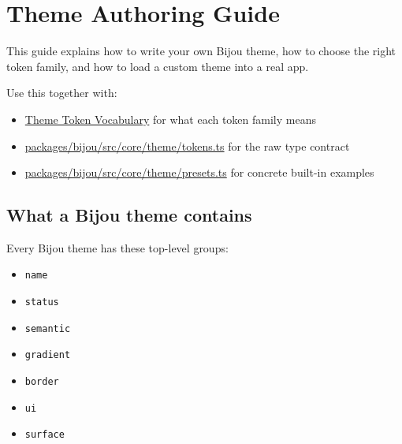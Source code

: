 \chapter{Theme Authoring Guide}\label{record-026}

\smallskip

This guide explains how to write your own Bijou theme, how to choose the right token family, and how to load a custom theme into a real app.

Use this together with:

\begin{itemize}
\tightlist
\item
  \href{https://github.com/flyingrobots/bijou/blob/cbd70612140e7a450d764b3c7be1c6af878b99bc/docs/design-system/theme-tokens.md}{Theme Token Vocabulary} for what each token family means
\item
  \href{https://github.com/flyingrobots/bijou/blob/cbd70612140e7a450d764b3c7be1c6af878b99bc/packages/bijou/src/core/theme/tokens.ts}{packages/bijou/src/core/theme/tokens.ts} for the raw type contract
\item
  \href{https://github.com/flyingrobots/bijou/blob/cbd70612140e7a450d764b3c7be1c6af878b99bc/packages/bijou/src/core/theme/presets.ts}{packages/bijou/src/core/theme/presets.ts} for concrete built-in examples
\end{itemize}

\section{What a Bijou theme contains}\label{record-026-what-a-bijou-theme-contains}

Every Bijou theme has these top-level groups:

\begin{itemize}
\tightlist
\item
  \texttt{n\allowbreak{}a\allowbreak{}m\allowbreak{}e}
\item
  \texttt{s\allowbreak{}t\allowbreak{}a\allowbreak{}t\allowbreak{}u\allowbreak{}s}
\item
  \texttt{s\allowbreak{}e\allowbreak{}m\allowbreak{}a\allowbreak{}n\allowbreak{}t\allowbreak{}i\allowbreak{}c}
\item
  \texttt{g\allowbreak{}r\allowbreak{}a\allowbreak{}d\allowbreak{}i\allowbreak{}e\allowbreak{}n\allowbreak{}t}
\item
  \texttt{b\allowbreak{}o\allowbreak{}r\allowbreak{}d\allowbreak{}e\allowbreak{}r}
\item
  \texttt{u\allowbreak{}i}
\item
  \texttt{s\allowbreak{}u\allowbreak{}r\allowbreak{}f\allowbreak{}a\allowbreak{}c\allowbreak{}e}
\end{itemize}

